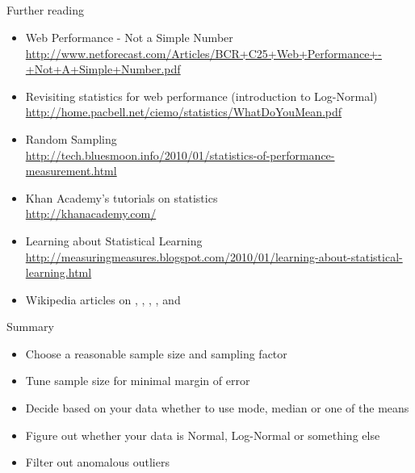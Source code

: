 \documentclass{beamer}
\begin{document}
\subsection{}
\begin{frame}{Further reading}
  \small{
  \begin{itemize}
  \item Web Performance - Not a Simple Number \\ \href{http://www.netforecast.com/Articles/BCR+C25+Web+Performance+-+Not+A+Simple+Number.pdf}{\tiny{http://www.netforecast.com/Articles/BCR+C25+Web+Performance+-+Not+A+Simple+Number.pdf}}
  \item Revisiting statistics for web performance (introduction to Log-Normal) \\ \href{http://home.pacbell.net/ciemo/statistics/WhatDoYouMean.pdf}{\tiny{http://home.pacbell.net/ciemo/statistics/WhatDoYouMean.pdf}}
  \item Random Sampling \\ \href{http://tech.bluesmoon.info/2010/01/statistics-of-performance-measurement.html}{\tiny{http://tech.bluesmoon.info/2010/01/statistics-of-performance-measurement.html}}
  \item Khan Academy's tutorials on statistics \\ \href{http://khanacademy.com/}{\tiny{http://khanacademy.com/}}
  \item Learning about Statistical Learning \\ \href{http://measuringmeasures.blogspot.com/2010/01/learning-about-statistical-learning.html}{\tiny{http://measuringmeasures.blogspot.com/2010/01/learning-about-statistical-learning.html}}
  \item Wikipedia articles on \href{http://en.wikipedia.org/wiki/Random_sample}{}, \href{http://en.wikipedia.org/wiki/Central_tendency}{}, \href{http://en.wikipedia.org/wiki/Standard_error_\%28statistics\%29}{}, \href{http://en.wikipedia.org/wiki/Confounding}{}, \href{http://en.wikipedia.org/wiki/Mean}{} and \href{http://en.wikipedia.org/wiki/IQR}{}
  \end{itemize}
  }
\end{frame}

\begin{frame}{Summary}
  \begin{itemize}
  \item Choose a reasonable sample size and sampling factor
  \item Tune sample size for minimal margin of error
  \item Decide based on your data whether to use mode, median or one of the means
  \item Figure out whether your data is Normal, Log-Normal or something else
  \item Filter out anomalous outliers
  \end{itemize}
\end{frame}
\end{document}
